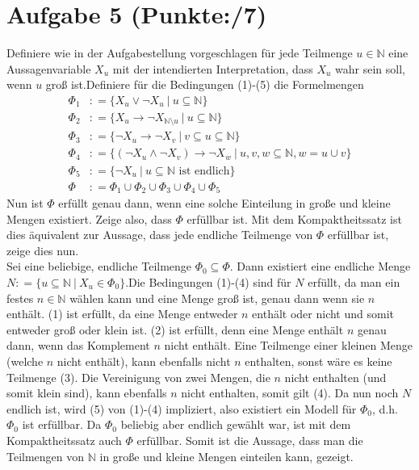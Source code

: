 \documentclass[11pt, a4paper]{article}
\newcommand{\pppp}{7}
\newcommand{\defgr}{\mathrel{\mathop:\!\!=}}
\begin{document}
\section*{Aufgabe 5 (Punkte:\qquad/\pppp)}
\begin{adjustwidth}{20pt}{20pt}
	Definiere wie in der Aufgabestellung vorgeschlagen für jede Teilmenge $u \in \mathbb{N}$ eine Aussagenvariable $X_u$ mit der intendierten Interpretation, dass $X_u$ wahr sein soll,
	wenn $u$ groß ist.Definiere für die Bedingungen (1)-(5) die Formelmengen 
	\begin{align*}
		\Phi_1 & \defgr \{ X_u \vee \neg X_u\ |\ u \subseteq \mathbb{N}\}\\
		\Phi_2 & \defgr \{ X_u \rightarrow \neg X_{\mathbb{N} \setminus u}\ |\ u \subseteq \mathbb{N}\}\\
		\Phi_3 & \defgr \{ \neg X_u \rightarrow \neg X_v\ |\ v \subseteq u \subseteq \mathbb{N}\}\\
		\Phi_4 & \defgr \{ (\neg X_u \wedge \neg X_v) \rightarrow \neg X_w\ |\ u,v,w \subseteq \mathbb{N}, w=u \cup v\}\\
		\Phi_5 & \defgr \{ \neg X_u\ |\ u \subseteq \mathbb{N} \text{ ist endlich}\}\\
		\Phi     & \defgr \Phi_1 \cup \Phi_2 \cup \Phi_3 \cup \Phi_4 \cup \Phi_5
\end{align*}
Nun ist $\Phi$ erfüllt genau dann, wenn eine solche Einteilung in große und kleine Mengen existiert. Zeige also, dass $\Phi$ erfüllbar ist. Mit dem Kompaktheitssatz ist dies
äquivalent zur Aussage, dass jede endliche Teilmenge von $\Phi$ erfüllbar ist, zeige dies nun.\\
Sei eine beliebige, endliche Teilmenge $\Phi_0 \subseteq \Phi$. Dann existiert eine endliche Menge $N \defgr \{ u \subseteq \mathbb{N}\ |\ X_u \in \Phi_0\}$.Die Bedingungen
(1)-(4) sind für $N$ erfüllt, da man ein festes $n \in \mathbb{N}$ wählen kann und eine Menge groß ist, genau dann wenn sie $n$ enthält. (1) ist erfüllt, da eine Menge entweder
$n$ enthält oder nicht und somit entweder groß oder klein ist. (2) ist erfüllt, denn eine Menge enthält $n$ genau dann, wenn das Komplement $n$ nicht enthält. Eine Teilmenge
einer kleinen Menge (welche $n$ nicht enthält), kann ebenfalls nicht $n$ enthalten, sonst wäre es keine Teilmenge (3). Die Vereinigung von zwei Mengen, die $n$ nicht enthalten
(und somit klein sind), kann ebenfalls $n$ nicht enthalten, somit gilt (4). Da nun noch $N$ endlich ist, wird (5) von (1)-(4) impliziert, also existiert ein Modell für $\Phi_0$,
d.h. $\Phi_0$ ist erfüllbar. Da $\Phi_0$ beliebig aber endlich gewählt war, ist mit dem Kompaktheitssatz auch $\Phi$ erfüllbar. Somit ist die Aussage, dass man die Teilmengen von
$\mathbb{N}$ in große und kleine Mengen einteilen kann, gezeigt.
\end{adjustwidth}
\end{document}

